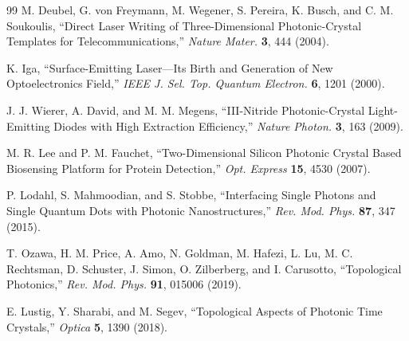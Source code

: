 \documentclass[11pt,a4paper]{article}
\begin{document}
\begin{thebibliography}{99}
M. Deubel, G. von Freymann, M. Wegener, S. Pereira, K. Busch, and C. M. Soukoulis,
``Direct Laser Writing of Three-Dimensional Photonic-Crystal Templates for Telecommunications,''
\textit{Nature Mater.} \textbf{3}, 444 (2004).

K. Iga,
``Surface-Emitting Laser—Its Birth and Generation of New Optoelectronics Field,''
\textit{IEEE J. Sel. Top. Quantum Electron.} \textbf{6}, 1201 (2000).

J. J. Wierer, A. David, and M. M. Megens,
``III-Nitride Photonic-Crystal Light-Emitting Diodes with High Extraction Efficiency,''
\textit{Nature Photon.} \textbf{3}, 163 (2009).

M. R. Lee and P. M. Fauchet,
``Two-Dimensional Silicon Photonic Crystal Based Biosensing Platform for Protein Detection,''
\textit{Opt. Express} \textbf{15}, 4530 (2007).

P. Lodahl, S. Mahmoodian, and S. Stobbe,
``Interfacing Single Photons and Single Quantum Dots with Photonic Nanostructures,''
\textit{Rev. Mod. Phys.} \textbf{87}, 347 (2015).

T. Ozawa, H. M. Price, A. Amo, N. Goldman, M. Hafezi, L. Lu, M. C. Rechtsman, D. Schuster, J. Simon, O. Zilberberg, and I. Carusotto,
``Topological Photonics,''
\textit{Rev. Mod. Phys.} \textbf{91}, 015006 (2019).

E. Lustig, Y. Sharabi, and M. Segev,
``Topological Aspects of Photonic Time Crystals,''
\textit{Optica} \textbf{5}, 1390 (2018).

\end{thebibliography}
\end{document}
